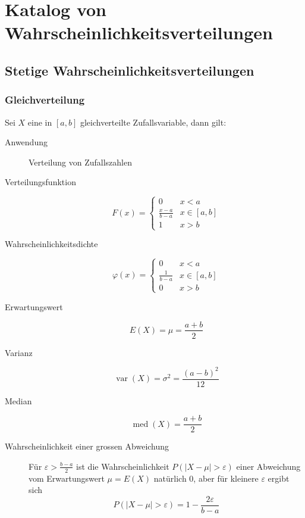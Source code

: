 \section{Katalog von Wahrscheinlichkeitsverteilungen}
\subsection{Stetige Wahrscheinlichkeitsverteilungen}
\subsubsection{Gleichverteilung}
Sei $X$ eine in $[a,b]$ gleichverteilte Zufallsvariable, dann gilt:
\begin{description}
  \item[Anwendung] Verteilung von Zufallszahlen
  \item[Verteilungsfunktion] \[F(x) = \begin{cases} 0 & x < a \\
    \frac{x-a}{b-a} & x \in [a,b] \\ 1 & x > b\end{cases}\]
  \item[Wahrscheinlichkeitsdichte] \[\varphi(x) = \begin{cases} 0 & x < a \\
    \frac{1}{b-a} & x \in [a,b] \\ 0 & x > b\end{cases}\]
  \item[Erwartungswert] \[E(X) = \mu = \frac{a+b}{2}\]
  \item[Varianz] \[\operatorname{var}(X) = \sigma^2 = \frac{(a-b)^2}{12}\]
  \item[Median] \[\operatorname{med}(X) = \frac{a+b}{2}\]
  \item[Wahrscheinlichkeit einer grossen Abweichung] Für $\varepsilon >
  \frac{b-a}{2}$ ist die Wahrscheinlichkeit $P(|X-\mu| > \varepsilon)$
    einer Abweichung vom Erwartungswert $\mu = E(X)$ natürlich 0, aber für
    kleinere $\varepsilon$ ergibt sich
    \[P(|X-\mu| > \varepsilon) = 1 - \frac{2\varepsilon}{b-a}\]
\end{description}

